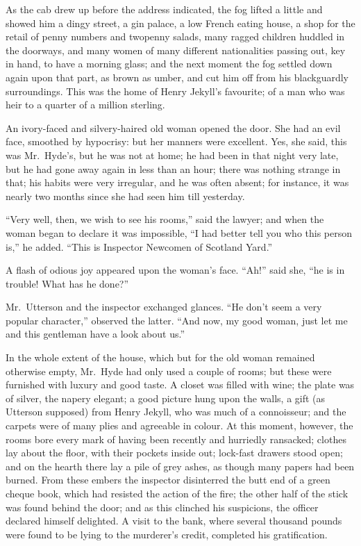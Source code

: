 \documentclass[12pt,openright]{book}
\begin{document}
As the cab drew up before the address indicated, the fog lifted a little and showed him a dingy street, a gin palace, a low French eating house, a shop for the retail of penny numbers and twopenny salads, many ragged children huddled in the doorways, and many women of many different nationalities passing out, key in hand, to have a morning glass; and the next moment the fog settled down again upon that part, as brown as umber, and cut him off from his blackguardly surroundings. This was the home of Henry Jekyll’s favourite; of a man who was heir to a quarter of a million sterling.

An ivory-faced and silvery-haired old woman opened the door. She had an evil face, smoothed by hypocrisy: but her manners were excellent. Yes, she said, this was Mr. Hyde’s, but he was not at home; he had been in that night very late, but he had gone away again in less than an hour; there was nothing strange in that; his habits were very irregular, and he was often absent; for instance, it was nearly two months since she had seen him till yesterday.

“Very well, then, we wish to see his rooms,” said the lawyer; and when the woman began to declare it was impossible, “I had better tell you who this person is,” he added. “This is Inspector Newcomen of Scotland Yard.”

A flash of odious joy appeared upon the woman’s face. “Ah!” said she, “he is in trouble! What has he done?”

Mr. Utterson and the inspector exchanged glances. “He don’t seem a very popular character,” observed the latter. “And now, my good woman, just let me and this gentleman have a look about us.”

In the whole extent of the house, which but for the old woman remained otherwise empty, Mr. Hyde had only used a couple of rooms; but these were furnished with luxury and good taste. A closet was filled with wine; the plate was of silver, the napery elegant; a good picture hung upon the walls, a gift (as Utterson supposed) from Henry Jekyll, who was much of a connoisseur; and the carpets were of many plies and agreeable in colour. At this moment, however, the rooms bore every mark of having been recently and hurriedly ransacked; clothes lay about the floor, with their pockets inside out; lock-fast drawers stood open; and on the hearth there lay a pile of grey ashes, as though many papers had been burned. From these embers the inspector disinterred the butt end of a green cheque book, which had resisted the action of the fire; the other half of the stick was found behind the door; and as this clinched his suspicions, the officer declared himself delighted. A visit to the bank, where several thousand pounds were found to be lying to the murderer’s credit, completed his gratification.
\end{document}

